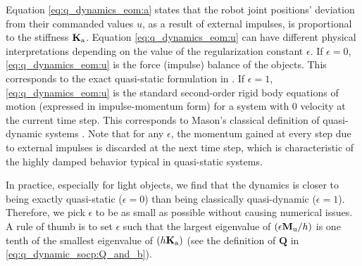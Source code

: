Equation \eqref{eq:q_dynamics_eom:a} states that the robot joint positions' deviation from their commanded values $u$, as a result of external impulses, is proportional to the stiffness $\mathbf{K}_\mathrm{a}$. 
Equation \eqref{eq:q_dynamics_eom:u} can have different physical interpretations depending on the value of the regularization constant $\epsilon$.
If $\epsilon = 0$, \eqref{eq:q_dynamics_eom:u} is the force (impulse) balance of the objects. This corresponds to the exact quasi-static formulation in  \cite{pang2021convex}. 
If $\epsilon = 1$, \eqref{eq:q_dynamics_eom:u} is the standard second-order rigid body equations of motion (expressed in impulse-momentum form) for a system with 0 velocity at the current time step. 
This corresponds to Mason's classical definition of quasi-dynamic systems \cite{mason2001mechanics}. 
Note that for any $\epsilon$, the momentum gained at every step due to external impulses is discarded at the next time step, which is characteristic of the highly damped behavior typical in quasi-static systems.

In practice, especially for light objects, we find that the dynamics is closer to being exactly quasi-static ($\epsilon = 0$) than being classically quasi-dynamic ($\epsilon = 1$). Therefore, we pick $\epsilon$ to be as small as possible without causing numerical issues. A rule of thumb is to set $\epsilon$ such that the largest eigenvalue of $(\epsilon \mathbf{M}_\mathrm{u} / h)$ is one tenth of the smallest eigenvalue of $(h \mathbf{K}_\mathrm{a})$ (see the definition of $\mathbf{Q}$ in \eqref{eq:q_dynamic_socp:Q_and_b}).

